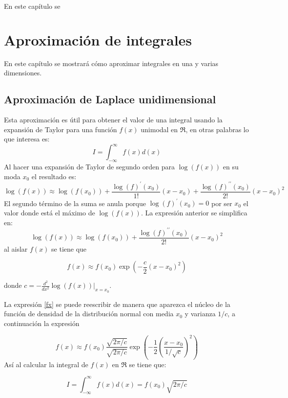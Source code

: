 \documentclass[10pt,]{krantz}
\begin{document}
En este capítulo se

\chapter{Aproximación de integrales}\label{aproximacion-de-integrales}

En este capítulo se mostrará cómo aproximar integrales en una y varias
dimensiones.

\section{Aproximación de Laplace
unidimensional}\label{aproximacion-de-laplace-unidimensional}

Esta aproximación es útil para obtener el valor de una integral usando
la expansión de Taylor para una función \(f(x)\) unimodal en \(\Re\), en
otras palabras lo que interesa es:
\[ I = \int_{-\infty}^{\infty} f(x) d(x)\] Al hacer una expansión de
Taylor de segundo orden para \(\log(f(x))\) en su moda \(x_0\) el
resultado es:
\[ \log(f(x)) \approx \log(f(x_0)) + \frac{\log(f)^\prime(x_0)}{1!} (x-x_0) + \frac{\log(f)^{\prime \prime}(x_0)}{2!} (x-x_0)^2 \]
El segundo término de la suma se anula porque \(\log(f)^\prime(x_0)=0\)
por ser \(x_0\) el valor donde está el máximo de \(\log(f(x))\). La
expresión anterior se simplifica en:
\[ \log(f(x)) \approx \log(f(x_0)) + \frac{\log(f)^{\prime \prime}(x_0)}{2!} (x-x_0)^2 \]
al aislar \(f(x)\) se tiene que

\begin{equation} \label{fx}
f(x) \approx f(x_0)  \exp \left( -\frac{c}{2} (x-x_0)^2 \right)
\end{equation}

donde \(c=-\frac{d^2}{dx^2} \log(f(x)) \bigg|_{x=x_0}\).

La expresión \ref{fx} se puede reescribir de manera que aparezca el
núcleo de la función de densidad de la distribución normal con media
\(x_0\) y varianza \(1/c\), a continuación la expresión

\[
f(x) \approx f(x_0) \frac{\sqrt{2 \pi / c}}{\sqrt{2 \pi / c}}  \exp \left( -\frac{1}{2} \left( \frac{x-x_0}{1/\sqrt{c}} \right)^2 \right)
\] Así al calcular la integral de \(f(x)\) en \(\Re\) se tiene que:

\begin{equation} \label{aprox_laplace}
I = \int_{-\infty}^{\infty} f(x) d(x) = f(x_0) \sqrt{2 \pi / c}
\end{equation}
\end{document}
